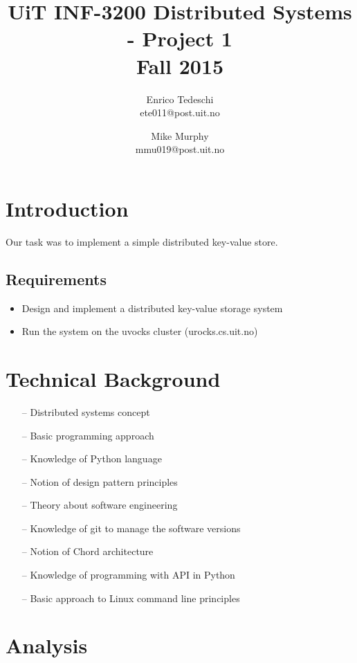 \documentclass[11pt,conference]{IEEEtran}
\title{UiT INF-3200 Distributed Systems - Project 1\\Fall 2015}
\author{Enrico Tedeschi\\ete011@post.uit.no
    \and Mike Murphy\\mmu019@post.uit.no}
\begin{document}
\maketitle


\section{Introduction}

Our task was to implement a simple distributed key-value store.


\subsection{Requirements}


\begin{itemize} 
\item Design and implement a distributed key-value storage system
\item Run the system on the uvocks cluster (urocks.cs.uit.no)
\end{itemize}

\fi


\section{Technical Background}


\begin{itemize} 
\item[--] Distributed systems concept
\item[--] Basic programming approach
\item[--] Knowledge of Python language
\item[--] Notion of design pattern principles
\item[--] Theory about software engineering
\item[--] Knowledge of git to manage the software versions
\item[--] Notion of Chord architecture
\item[--] Knowledge of programming with API in Python
\item[--] Basic approach to Linux command line principles
\end{itemize}

\fi


\section{Analysis}
\end{document}
